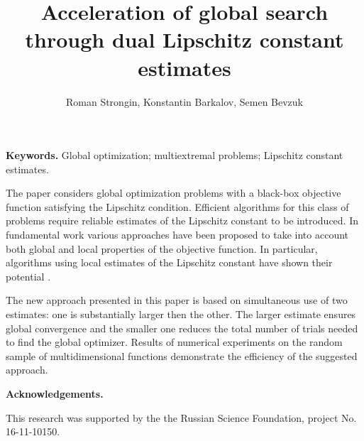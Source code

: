 \documentclass[oribibl]{llncs}
\begin{document}
\cleardoublepage

\title{Acceleration of global search through dual Lipschitz constant estimates}
\author{Roman Strongin, Konstantin Barkalov, Semen Bevzuk}



\maketitle

\thispagestyle{fancy}

\textbf{Keywords.} Global optimization; multiextremal problems; Lipschitz constant estimates.

 \vspace*{0.5cm}


The paper considers global optimization problems with a black-box objective function satisfying the Lipschitz condition. 
Efficient algorithms for this class of problems require reliable estimates of the Lipschitz constant to be introduced. 
In fundamental work \cite{Book} various approaches have been proposed to take into account both global and local properties of the objective function. 
In particular, algorithms using local estimates of the Lipschitz constant have shown their potential \cite{Sergeyev10, Sergeyev16}.

The new approach presented in this paper is based on simultaneous use of two estimates: one is substantially larger then the other. 
The larger estimate ensures global convergence and the smaller one reduces the total number of trials needed to find the global optimizer.
Results of numerical experiments on the random sample of multidimensional functions demonstrate the efficiency of the suggested approach.  

\textbf{Acknowledgements.}

This research was supported by the the Russian Science Foundation, project No.\,16-11-10150.

\vspace{0.5cm}
\end{document}
